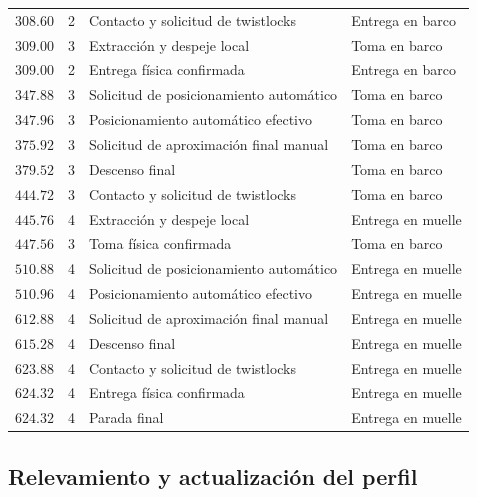 \documentclass[a4paper,10pt,onecolumn,journal]{ieeeconf}
\numberwithin{equation}{section}
\begin{document}
\begin{longtable}{C{1.6cm} C{1.0cm} L{6.4cm} L{4.4cm}}
$308.60$ & 2 & Contacto y solicitud de twistlocks & Entrega en barco\\

$309.00$ & 3 & Extracción y despeje local & Toma en barco\\

$309.00$ & 2 & Entrega física confirmada & Entrega en barco\\

$347.88$ & 3 & Solicitud de posicionamiento automático & Toma en barco\\

$347.96$ & 3 & Posicionamiento automático efectivo & Toma en barco\\

$375.92$ & 3 & Solicitud de aproximación final manual & Toma en barco\\

$379.52$ & 3 & Descenso final & Toma en barco\\

$444.72$ & 3 & Contacto y solicitud de twistlocks & Toma en barco\\

$445.76$ & 4 & Extracción y despeje local & Entrega en muelle\\

$447.56$ & 3 & Toma física confirmada & Toma en barco\\

$510.88$ & 4 & Solicitud de posicionamiento automático & Entrega en muelle\\

$510.96$ & 4 & Posicionamiento automático efectivo & Entrega en muelle\\

$612.88$ & 4 & Solicitud de aproximación final manual & Entrega en muelle\\

$615.28$ & 4 & Descenso final & Entrega en muelle\\

$623.88$ & 4 & Contacto y solicitud de twistlocks & Entrega en muelle\\

$624.32$ & 4 & Entrega física confirmada & Entrega en muelle\\

$624.32$ & 4 & Parada final & Entrega en muelle\\

\bottomrule\end{longtable}

\subsection{Relevamiento y actualización del perfil}
\end{document}
